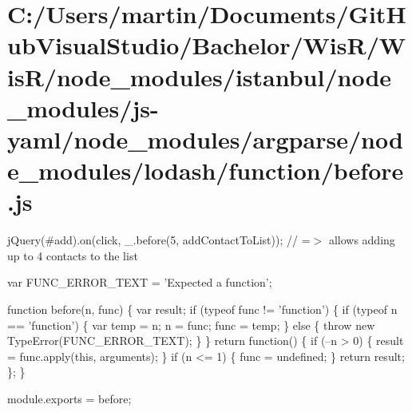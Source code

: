 \hypertarget{_c_1_2_users_2martin_2_documents_2_git_hub_visual_studio_2_bachelor_2_wis_r_2_wis_r_2node_modulea6786fe362c0e01292f7d68481d1aec0}{}\section{C\+:/\+Users/martin/\+Documents/\+Git\+Hub\+Visual\+Studio/\+Bachelor/\+Wis\+R/\+Wis\+R/node\+\_\+modules/istanbul/node\+\_\+modules/js-\/yaml/node\+\_\+modules/argparse/node\+\_\+modules/lodash/function/before.\+js}
j\+Query(\textquotesingle{}\#add\textquotesingle{}).on(\textquotesingle{}click\textquotesingle{}, \+\_\+.\+before(5, add\+Contact\+To\+List)); // =$>$ allows adding up to 4 contacts to the list


\begin{DoxyCodeInclude}

var FUNC\_ERROR\_TEXT = \textcolor{stringliteral}{'Expected a function'};

\textcolor{keyword}{function} before(n, func) \{
  var result;
  \textcolor{keywordflow}{if} (typeof func != \textcolor{stringliteral}{'function'}) \{
    \textcolor{keywordflow}{if} (typeof n == \textcolor{stringliteral}{'function'}) \{
      var temp = n;
      n = func;
      func = temp;
    \} \textcolor{keywordflow}{else} \{
      \textcolor{keywordflow}{throw} \textcolor{keyword}{new} TypeError(FUNC\_ERROR\_TEXT);
    \}
  \}
  \textcolor{keywordflow}{return} \textcolor{keyword}{function}() \{
    \textcolor{keywordflow}{if} (--n > 0) \{
      result = func.apply(\textcolor{keyword}{this}, arguments);
    \}
    \textcolor{keywordflow}{if} (n <= 1) \{
      func = undefined;
    \}
    \textcolor{keywordflow}{return} result;
  \};
\}

module.exports = before;
\end{DoxyCodeInclude}
 